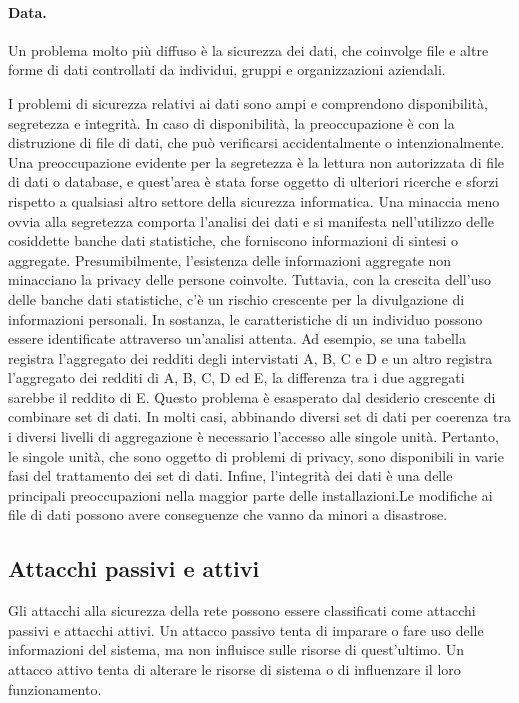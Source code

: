 \paragraph{Data.}  Un  problema molto più diffuso è la sicurezza dei dati, che coinvolge file e altre forme di dati controllati da individui, gruppi e organizzazioni aziendali.

I problemi di sicurezza relativi ai dati sono ampi e comprendono disponibilità, segretezza e integrità. In caso di disponibilità, la preoccupazione è con la distruzione di file di dati, che può verificarsi accidentalmente o intenzionalmente. 
Una preoccupazione evidente per la segretezza è la lettura non autorizzata di file di dati o database, e quest'area è stata forse oggetto di ulteriori ricerche e sforzi rispetto a qualsiasi altro settore della sicurezza informatica. Una minaccia meno ovvia alla segretezza comporta l'analisi dei dati e si manifesta nell'utilizzo delle cosiddette banche dati statistiche, che forniscono informazioni di sintesi o aggregate. Presumibilmente, l'esistenza delle informazioni aggregate non minacciano la privacy delle persone coinvolte. Tuttavia, con la crescita dell'uso delle banche dati statistiche, c'è un rischio crescente per la divulgazione di informazioni personali. In sostanza, le caratteristiche di un individuo possono essere identificate attraverso un'analisi attenta. Ad esempio, se una tabella registra l'aggregato dei redditi degli intervistati A, B, C e D e un altro registra l'aggregato dei redditi di A, B, C, D ed E, la differenza tra i due aggregati sarebbe il reddito di E. Questo problema è esasperato dal desiderio crescente di combinare set di dati. In molti casi, abbinando diversi set di dati per coerenza tra i diversi livelli di aggregazione è necessario l'accesso alle singole unità. Pertanto, le singole unità, che sono oggetto di problemi di privacy, sono disponibili in varie fasi del trattamento dei set di dati. 
Infine, l'integrità dei dati è una delle principali preoccupazioni nella maggior parte delle installazioni.Le modifiche ai file di dati possono avere conseguenze che vanno da minori a disastrose.

\subsection{Attacchi passivi e attivi}
Gli attacchi alla sicurezza della rete possono essere classificati
come attacchi passivi e attacchi attivi. Un attacco passivo tenta di imparare o fare
uso delle informazioni del sistema, ma non influisce sulle risorse di quest'ultimo. Un attacco attivo tenta di alterare le risorse di sistema o di influenzare il loro funzionamento.

